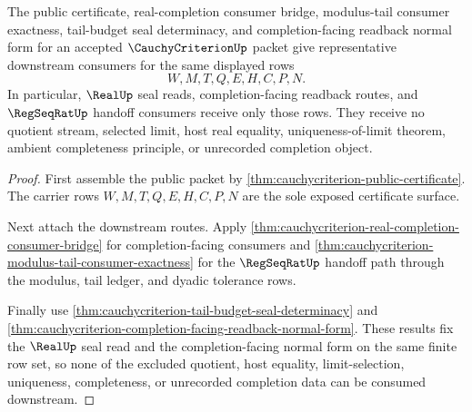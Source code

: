 \begin{theorem}
\label{thm:cauchycriterion-mature-downstream-examples}
The public certificate, real-completion consumer bridge, modulus-tail consumer
exactness, tail-budget seal determinacy, and completion-facing readback normal
form for an accepted $\CauchyCriterionUp$ packet give representative downstream
consumers for the same displayed rows
$$
W,M,T,Q,E,H,C,P,N.
$$
In particular, $\RealUp$ seal reads, completion-facing readback routes, and
$\RegSeqRatUp$ handoff consumers receive only those rows. They receive no
quotient stream, selected limit, host real equality, uniqueness-of-limit
theorem, ambient completeness principle, or unrecorded completion object.
\end{theorem}
\begin{proof}
First assemble the public packet by
\autoref{thm:cauchycriterion-public-certificate}. The carrier rows
$W,M,T,Q,E,H,C,P,N$ are the sole exposed certificate surface.

Next attach the downstream routes. Apply
\autoref{thm:cauchycriterion-real-completion-consumer-bridge} for
completion-facing consumers and
\autoref{thm:cauchycriterion-modulus-tail-consumer-exactness} for the
$\RegSeqRatUp$ handoff path through the modulus, tail ledger, and dyadic
tolerance rows.

Finally use \autoref{thm:cauchycriterion-tail-budget-seal-determinacy} and
\autoref{thm:cauchycriterion-completion-facing-readback-normal-form}. These
results fix the $\RealUp$ seal read and the completion-facing normal form on
the same finite row set, so none of the excluded quotient, host equality,
limit-selection, uniqueness, completeness, or unrecorded completion data can be
consumed downstream.
\end{proof}


